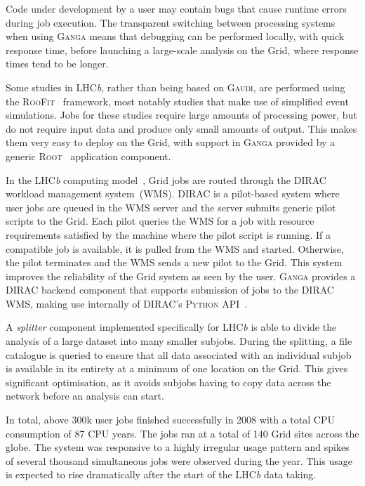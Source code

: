 \documentclass{elsart}
\def\lhcb {LHC{\em b\/}\xspace}
\def\dirac{DIRAC\xspace}
\def\ganga {\textsc{Ganga}\xspace}
\def\python {\textsc{Python}\xspace}
\def\root {\textsc{Root}\xspace}
\def\gaudi {\textsc{Gaudi}\xspace}
\def\grid {Grid\xspace}
\def\roofit{\textsc{RooFit}\xspace}
\newcommand{\qq}[1]{#1}
\begin{document}
\begin{linenumbers}
Code under development by a user may contain bugs that cause
runtime errors during job execution. The transparent switching between
processing systems when using \ganga means that debugging can be
performed locally, with quick response time, before launching a large-scale
analysis on the \grid, where response times tend to be longer.

Some studies in \lhcb, rather than being based on \gaudi, are performed using
the \roofit~\cite{RooFit} framework, most notably studies that make use of
simplified event simulations.   Jobs for these studies require large amounts
of processing power, but do not require
input data and produce only small amounts of output. This makes them
very easy to deploy on the \grid, with support in \ganga provided by a
generic \root~\cite{ROOT} application component.

\qq{
In the \lhcb computing model~\cite{lhcb:2005jj}, \grid jobs are routed
through the
\dirac~\cite{DIRAC} workload management system~(WMS). \dirac is a pilot-based
system where user jobs are queued in the WMS server and the server
submits generic pilot scripts to the Grid.  Each pilot queries the WMS
for a job with resource requirements satisfied by the machine where
the pilot script is running. If a compatible job is available, it is
pulled from the WMS and started.  Otherwise, the pilot terminates and
the WMS sends a new pilot to the \grid.  This system improves the
reliability of the \grid system as seen by the user. \ganga provides
a \dirac backend component that supports submission of jobs to
the \dirac WMS, making use internally of \dirac's \python
API~\cite{DIRACAPI}.  }

A \emph{splitter} component implemented specifically for \lhcb is able to divide
the
analysis of a large dataset into many smaller subjobs. During the splitting,
a file catalogue is queried to ensure that all data associated with an
individual subjob is
available in its entirety at a minimum of one location on the \grid. This gives
significant optimisation, as it avoids subjobs having to copy data across the
network
before an analysis can start.

In total, above 300k user jobs finished successfully in 2008 with a total
CPU consumption of 87 CPU years. The jobs ran at a total of 140 Grid
sites across the globe. The system was responsive to a highly irregular
usage pattern and spikes of several thousand simultaneous jobs were
observed during the year. This usage is expected to rise dramatically after the start of the
\lhcb data taking.


\end{linenumbers}
\end{document}
